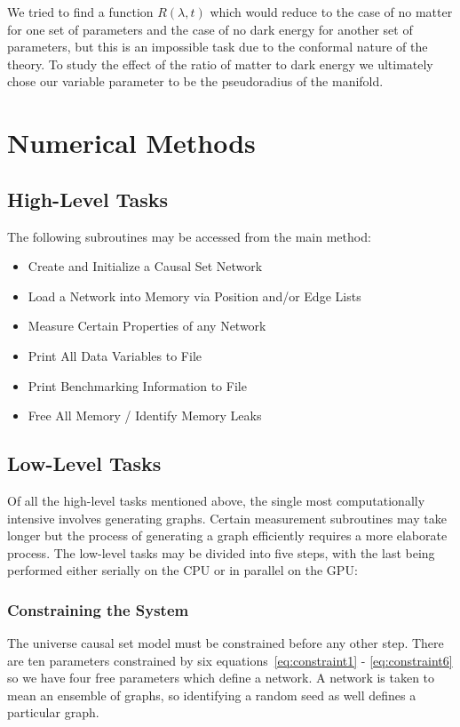 \documentclass[preprint,notitlepage,amsmath,amssymb,floatfix]{revtex4-1}
\begin{document}
\noindent We tried to find a function $R\left(\lambda,t\right)$ which would reduce to the case of no matter for one set of parameters and the case of no dark energy for another set of parameters, but this is an impossible task due to the conformal nature of the theory.  To study the effect of the ratio of matter to dark energy we ultimately chose our variable parameter to be the pseudoradius of the manifold.

\section{Numerical Methods}
\subsection{High-Level Tasks}
\noindent The following subroutines may be accessed from the main method:
\begin{itemize}
  \item Create and Initialize a Causal Set Network
  \item Load a Network into Memory via Position and/or Edge Lists
  \item Measure Certain Properties of any Network
  \item Print All Data Variables to File
  \item Print Benchmarking Information to File
  \item Free All Memory / Identify Memory Leaks
\end{itemize}
\subsection{Low-Level Tasks}
Of all the high-level tasks mentioned above, the single most computationally intensive involves generating graphs.  
Certain measurement subroutines may take longer but the process of generating a graph efficiently requires a more elaborate process.  
The low-level tasks may be divided into five steps, with the last being performed either serially on the CPU or in parallel on the GPU:
\subsubsection{Constraining the System}
The universe causal set model must be constrained before any other step.  
There are ten parameters constrained by six equations~\eqref{eq:constraint1} - \eqref{eq:constraint6} so we have four free parameters which define a network.  
A network is taken to mean an ensemble of graphs, so identifying a random seed as well defines a particular graph.
\end{document}
